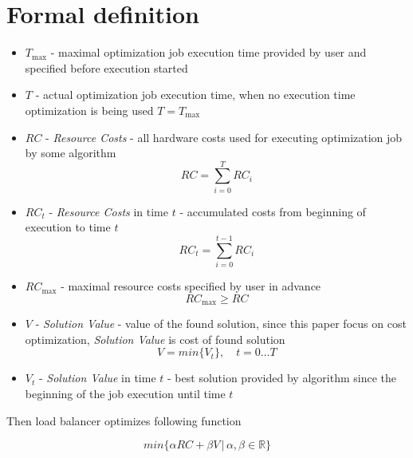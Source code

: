 \section{Formal definition}\label{sec:formal-definition}
\begin{itemize}
    \item $T_{\max}$ - maximal optimization job execution time provided by user and specified before execution started

    \item $T$ - actual optimization job execution time, when no execution time optimization is being used $T = T_{\max}$

    \item $RC$ - \textit{Resource Costs} - all hardware costs used for executing optimization job by some algorithm
    \begin{equation}
        RC = \sum_{i=0}^T RC_i
    \end{equation}

    \item $RC_t$ - \textit{Resource Costs} in time $t$ - accumulated costs from beginning of execution to time $t$
    \begin{equation}
        RC_{t} = \sum_{i=0}^{t-1} RC_i
    \end{equation}

    \item $RC_{\max}$ - maximal resource costs specified by user in advance
    \begin{equation}
        RC_{\max} \geq RC
    \end{equation}

    \item $V$ - \textit{Solution Value} - value of the found solution, since this paper focus on cost optimization,
    \textit{Solution Value} is cost of found solution
    \begin{equation}
        V = min \{ V_t \}, \quad t = 0 \dots T
    \end{equation}

    \item $V_t$ - \textit{Solution Value} in time $t$ - best solution provided by algorithm since the beginning of the job execution
    until time $t$

\end{itemize}

Then load balancer optimizes following function

\begin{equation}
    min \{ \alpha RC + \beta V \,|\, \alpha, \beta \in \mathbb{R} \}
\end{equation}

